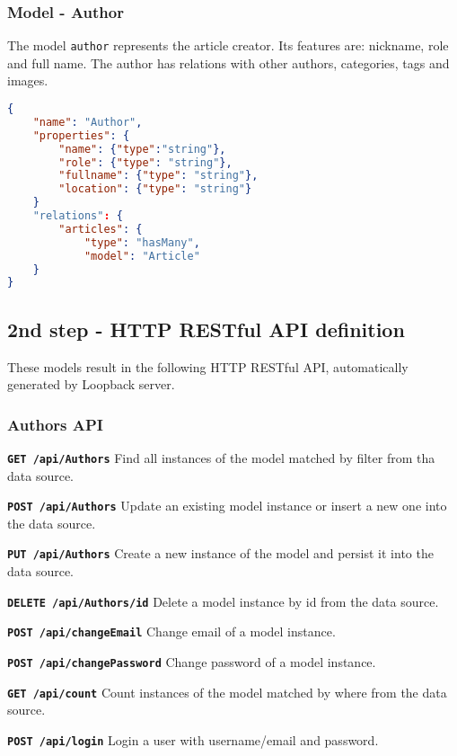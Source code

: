 \subsubsection{Model - Author}

The model \texttt{author} represents the article creator. Its features are: nickname, role and full name. The author has relations with other authors, categories, tags and images.

\begin{lstlisting}[language=json]
{
	"name": "Author",
	"properties": {
		"name": {"type":"string"},
    	"role": {"type": "string"},
    	"fullname": {"type": "string"},
    	"location": {"type": "string"}
	}
	"relations": {
    	"articles": {
     		"type": "hasMany",
      		"model": "Article"
    }
}
\end{lstlisting}

\subsection{2nd step - HTTP RESTful API definition}

These models result in the following HTTP RESTful API, automatically generated by Loopback server.

\subsubsection{Authors API}

\texttt{\textbf{GET /api/Authors}} Find all instances of the model matched by filter from tha data source.

\texttt{\textbf{POST /api/Authors}} Update an existing model instance or insert a new one into the data source.

\texttt{\textbf{PUT /api/Authors}} Create a new instance of the model and persist it into the data source.

\texttt{\textbf{DELETE /api/Authors/{id}}} Delete a model instance by id from the data source.

\texttt{\textbf{POST /api/changeEmail}} Change email of a model instance.

\texttt{\textbf{POST /api/changePassword}} Change password of a model instance.

\texttt{\textbf{GET /api/count}} Count instances of the model matched by where from the data source.

\texttt{\textbf{POST /api/login}} Login a user with username/email and password.

